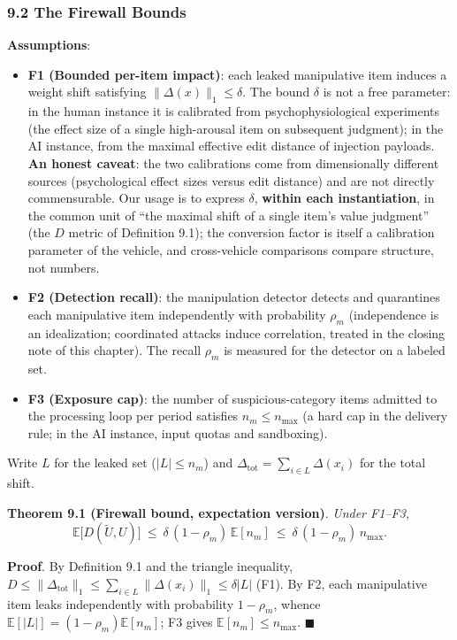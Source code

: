 \documentclass[
  11pt]{article}
\providecommand{\tightlist}{%
  \setlength{\itemsep}{0pt}\setlength{\parskip}{0pt}}
\begin{document}
\subsubsection{9.2 The Firewall Bounds}\label{the-firewall-bounds}

\textbf{Assumptions}:

\begin{itemize}
\tightlist
\item
  \textbf{F1 (Bounded per-item impact)}: each leaked manipulative item
  induces a weight shift satisfying \(\|\Delta(x)\|_1 \le \delta\). The
  bound \(\delta\) is not a free parameter: in the human instance it is
  calibrated from psychophysiological experiments (the effect size of a
  single high-arousal item on subsequent judgment); in the AI instance,
  from the maximal effective edit distance of injection payloads.
  \textbf{An honest caveat}: the two calibrations come from
  dimensionally different sources (psychological effect sizes versus
  edit distance) and are not directly commensurable. Our usage is to
  express \(\delta\), \textbf{within each instantiation}, in the common
  unit of ``the maximal shift of a single item's value judgment'' (the
  \(D\) metric of Definition 9.1); the conversion factor is itself a
  calibration parameter of the vehicle, and cross-vehicle comparisons
  compare structure, not numbers.
\item
  \textbf{F2 (Detection recall)}: the manipulation detector detects and
  quarantines each manipulative item independently with probability
  \(\rho_m\) (independence is an idealization; coordinated attacks
  induce correlation, treated in the closing note of this chapter). The
  recall \(\rho_m\) is measured for the detector on a labeled set.
\item
  \textbf{F3 (Exposure cap)}: the number of suspicious-category items
  admitted to the processing loop per period satisfies
  \(n_m \le n_{\max}\) (a hard cap in the delivery rule; in the AI
  instance, input quotas and sandboxing).
\end{itemize}

Write \(L\) for the leaked set (\(|L| \le n_m\)) and
\(\Delta_{\mathrm{tot}} = \sum_{i \in L} \Delta(x_i)\) for the total
shift.

\textbf{Theorem 9.1 (Firewall bound, expectation version)}. \emph{Under
F1--F3,}
\[\mathbb{E}\big[D(\tilde U, U)\big] \ \le\ \delta\,(1 - \rho_m)\,\mathbb{E}[n_m] \ \le\ \delta\,(1-\rho_m)\, n_{\max}.\]

\textbf{Proof}. By Definition 9.1 and the triangle inequality,
\(D \le \|\Delta_{\mathrm{tot}}\|_1 \le \sum_{i\in L}\|\Delta(x_i)\|_1 \le \delta |L|\)
(F1). By F2, each manipulative item leaks independently with probability
\(1-\rho_m\), whence \(\mathbb{E}[|L|] = (1-\rho_m)\mathbb{E}[n_m]\); F3
gives \(\mathbb{E}[n_m] \le n_{\max}\). \(\blacksquare\)
\end{document}
